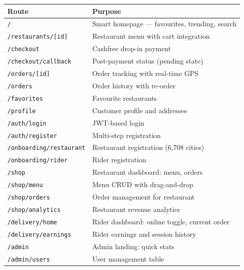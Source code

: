 \documentclass[11pt,a4paper,twoside]{book}
\newcommand{\th}[1]{\textbf{\color{white}#1}}
\begin{document}
\begin{center}\footnotesize
\begin{longtable}{p{5.5cm}p{7cm}}
\toprule
\rowcolor{headbg}\th{Route} & \th{Purpose} \\
\midrule
\texttt{/}                          & Smart homepage — favourites, trending, search \\
\rowcolor{rowalt}\texttt{/restaurants/[id]}            & Restaurant menu with cart integration \\
\texttt{/checkout}                  & Cashfree drop-in payment \\
\rowcolor{rowalt}\texttt{/checkout/callback}           & Post-payment status (pending state) \\
\texttt{/orders/[id]}               & Order tracking with real-time GPS \\
\rowcolor{rowalt}\texttt{/orders}                      & Order history with re-order \\
\texttt{/favorites}                 & Favourite restaurants \\
\rowcolor{rowalt}\texttt{/profile}                     & Customer profile and addresses \\
\texttt{/auth/login}                & JWT-based login \\
\rowcolor{rowalt}\texttt{/auth/register}               & Multi-step registration \\
\texttt{/onboarding/restaurant}     & Restaurant registration (6,708 cities) \\
\rowcolor{rowalt}\texttt{/onboarding/rider}            & Rider registration \\
\texttt{/shop}                      & Restaurant dashboard: menu, orders \\
\rowcolor{rowalt}\texttt{/shop/menu}                   & Menu CRUD with drag-and-drop \\
\texttt{/shop/orders}               & Order management for restaurant \\
\rowcolor{rowalt}\texttt{/shop/analytics}              & Restaurant revenue analytics \\
\texttt{/delivery/home}             & Rider dashboard: online toggle, current order \\
\rowcolor{rowalt}\texttt{/delivery/earnings}           & Rider earnings and session history \\
\texttt{/admin}                     & Admin landing: quick stats \\
\rowcolor{rowalt}\texttt{/admin/users}                 & User management table \\

\end{longtable}
\end{center}
\end{document}
